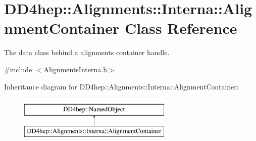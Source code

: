 \hypertarget{class_d_d4hep_1_1_alignments_1_1_interna_1_1_alignment_container}{}\section{D\+D4hep\+:\+:Alignments\+:\+:Interna\+:\+:Alignment\+Container Class Reference}
\label{class_d_d4hep_1_1_alignments_1_1_interna_1_1_alignment_container}


The data class behind a alignments container handle.  




{\ttfamily \#include $<$Alignments\+Interna.\+h$>$}

Inheritance diagram for D\+D4hep\+:\+:Alignments\+:\+:Interna\+:\+:Alignment\+Container\+:\begin{figure}[H]
\begin{center}
\leavevmode
\includegraphics[height=2.000000cm]{class_d_d4hep_1_1_alignments_1_1_interna_1_1_alignment_container}
\end{center}
\end{figure}
